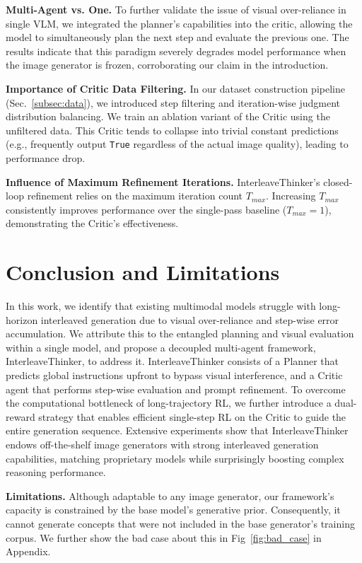 \documentclass{article} %
\begin{document}
\textbf{Multi-Agent vs. One.} 
To further validate the issue of visual over-reliance in single VLM, we integrated the planner's capabilities into the critic, allowing the model to simultaneously plan the next step and evaluate the previous one. The results indicate that this paradigm severely degrades model performance when the image generator is frozen, corroborating our claim in the introduction.

\textbf{Importance of Critic Data Filtering.} 
In our dataset construction pipeline (Sec.~\ref{subsec:data}), we introduced step filtering and iteration-wise judgment distribution balancing. We train an ablation variant of the Critic using the unfiltered data. This Critic tends to collapse into trivial constant predictions (e.g., frequently output \texttt{True} regardless of the actual image quality), leading to performance drop.

\textbf{Influence of Maximum Refinement Iterations.} 
InterleaveThinker's closed-loop refinement relies on the maximum iteration count $T_{max}$. Increasing $T_{max}$ consistently improves performance over the single-pass baseline ($T_{max}=1$), demonstrating the Critic's effectiveness.

\section{Conclusion and Limitations}
\label{sec:conclu}
In this work, we identify that existing multimodal models struggle with long-horizon interleaved generation due to visual over-reliance and step-wise error accumulation. We attribute this to the entangled planning and visual evaluation within a single model, and propose a decoupled multi-agent framework, InterleaveThinker, to address it. InterleaveThinker consists of a Planner that predicts global instructions upfront to bypass visual interference, and a Critic agent that performs step-wise evaluation and prompt refinement. To overcome the computational bottleneck of long-trajectory RL, we further introduce a dual-reward strategy that enables efficient single-step RL on the Critic to guide the entire generation sequence. Extensive experiments show that InterleaveThinker endows off-the-shelf image generators with strong interleaved generation capabilities, matching proprietary models while surprisingly boosting complex reasoning performance.

\textbf{Limitations.} Although adaptable to any image generator, our framework's capacity is constrained by the base model's generative prior. Consequently, it cannot generate concepts that were not included in the base generator's training corpus. We further show the bad case about this in Fig~\ref{fig:bad_case} in Appendix.
\end{document}
